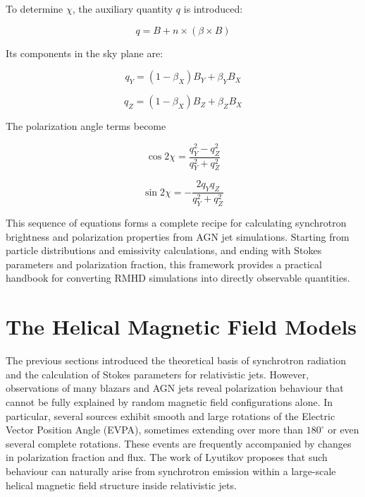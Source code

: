 \documentclass{article}
\begin{document}
To determine $\chi$, the auxiliary quantity $q$ is introduced:

\begin{equation}
q
=
B+n\times(\beta\times B)
\end{equation}

Its components in the sky plane are:

\begin{equation}
q_Y
=
(1-\beta_X)B_Y
+
\beta_YB_X
\end{equation}

\begin{equation}
q_Z
=
(1-\beta_X)B_Z
+
\beta_ZB_X
\end{equation}

The polarization angle terms become

\begin{equation}
\cos2\chi
=
\frac{
q_Y^2-q_Z^2
}
{
q_Y^2+q_Z^2
}
\end{equation}

\begin{equation}
\sin2\chi
=
-
\frac{
2q_Yq_Z
}
{
q_Y^2+q_Z^2
}
\end{equation}

This sequence of equations forms a complete recipe for calculating synchrotron brightness and polarization properties from AGN jet simulations. Starting from particle distributions and emissivity calculations, and ending with Stokes parameters and polarization fraction, this framework provides a practical handbook for converting RMHD simulations into directly observable quantities.
\section{The Helical Magnetic Field Models}

The previous sections introduced the theoretical basis of synchrotron radiation and the calculation of Stokes parameters for relativistic jets. However, observations of many blazars and AGN jets reveal polarization behaviour that cannot be fully explained by random magnetic field configurations alone. In particular, several sources exhibit smooth and large rotations of the Electric Vector Position Angle (EVPA), sometimes extending over more than $180^\circ$ or even several complete rotations. These events are frequently accompanied by changes in polarization fraction and flux. The work of Lyutikov proposes that such behaviour can naturally arise from synchrotron emission within a large-scale helical magnetic field structure inside relativistic jets.
\end{document}

